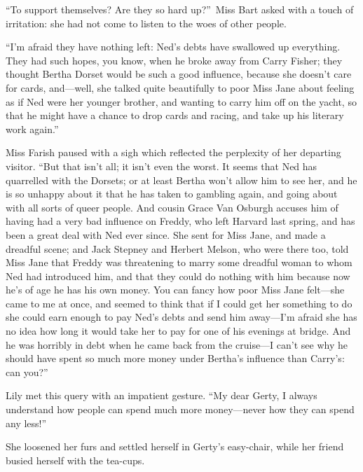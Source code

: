 \documentclass[12pt,a4paper]{book}
\begin{document}
``To support themselves? Are they so hard up?''\ Miss Bart asked
with a touch of irritation: she had not come to listen to the
woes of other people.





``I'm afraid they have nothing left: Ned's debts have swallowed up
everything. They had such hopes, you know, when he broke away
from Carry Fisher; they thought Bertha Dorset would be such a
good influence, because she doesn't care for cards, and---well,
she talked quite beautifully to poor Miss Jane about feeling as
if Ned were her younger brother, and wanting to carry him off on
the yacht, so that he might have a chance to drop cards and
racing, and take up his literary work again.''





Miss Farish paused with a sigh which reflected the perplexity of
her departing visitor. ``But that isn't all; it isn't even the
worst. It seems that Ned has quarrelled with the Dorsets; or at
least Bertha won't allow him to see her, and he is so unhappy
about it that he has taken to gambling again, and going about
with all sorts of queer people. And cousin Grace Van Osburgh
accuses him of having had a very bad influence on Freddy, who
left Harvard last spring, and has been a great deal with Ned ever
since. She sent for Miss Jane, and made a dreadful scene; and
Jack Stepney and Herbert Melson, who were there too, told Miss
Jane that Freddy was threatening to marry some dreadful woman to
whom Ned had introduced him, and that they could do nothing with
him because now he's of age he has his own money. You can fancy
how poor Miss Jane felt---she came to me at once, and seemed to
think that if I could get her something to do she could earn
enough to pay Ned's debts and send him away---I'm afraid she has
no idea how long it would take her to pay for one of his evenings
at bridge. And he was horribly in debt when he came back from the
cruise---I can't see why he should have spent so much more money
under Bertha's influence than Carry's: can you?''





Lily met this query with an impatient gesture. ``My dear Gerty, I
always understand how people can spend much more money---never how
they can spend any less!''





She loosened her furs and settled herself in Gerty's easy-chair,
while her friend busied herself with the tea-cups.
\end{document}
